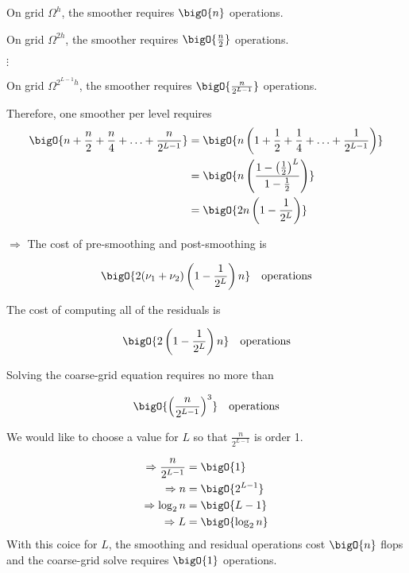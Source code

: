 On grid $\Omega^{h}$, the smoother requires $\bigO{n}$ operations. 

On grid $\Omega^{2h}$, the smoother requires $\bigO{\frac{n}{2}}$ operations. 

\hspace{4cm}$\vdots$

On grid $\Omega^{2^{L-1}h}$, the smoother requires $\bigO{\frac{n}{2^{L-1}}}$ operations. 

Therefore, one smoother per level requires
\begin{align*}
  \bigO{n+\frac{n}{2} + \frac{n}{4} + \ldots + \frac{n}{2^{L-1}}}
  &= \bigO{n\left(1+\frac{1}{2} + \frac{1}{4} + \ldots + \frac{1}{2^{L-1}}\right)}\\
  &=\bigO{n \left( \frac{1-\left( \frac{1}{2}\right)^L}{1-\frac{1}{2}} \right) }\\
  &= \bigO{2n \left( 1-\frac{1}{2^L}\right)}
\end{align*}

$\Rightarrow$ The cost of pre-smoothing and post-smoothing is

\begin{align*}
\bigO{2(\nu_1+\nu_2) \left( 1-\frac{1}{2^L} \right)n } \quad \text{operations}
\end{align*}

The cost of computing all of the residuals is

\begin{align*}
\bigO{2 \left( 1-\frac{1}{2^L} \right)n } \quad \text{operations}
\end{align*}

Solving the coarse-grid equation requires no more than 

\begin{equation*}
\bigO{ \left( \frac{n}{2^{L-1}}\right)^3 }\quad \text{operations}
\end{equation*}

We would like to choose a value for $L$ so that $\frac{n}{2^{L-1}}$ is order 1.

\begin{align*}
\Rightarrow \frac{n}{2^{L-1}} &= \bigO{1}\\
  \Rightarrow n &= \bigO{2^{L-1}} \\
  \Rightarrow \log_2 n &=\bigO{L-1}\\
  \Rightarrow L &= \bigO{\log_2n}
\end{align*}
With this coice for $L$, the smoothing and residual operations cost $\bigO{n}$
flops and the 
coarse-grid solve requires $\bigO{1}$ operations.

